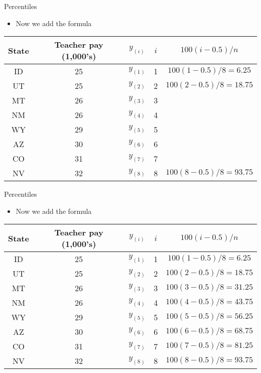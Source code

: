 \documentclass[xcolor=dvipsnames]{beamer}
\begin{document}
\begin{frame}{Percentiles}
\begin{itemize}
	\item Now we add the formula
\end{itemize}
\begin{center}
	\begin{tabular}{|c|c|c|c|c|}
		\hline 
		\textbf{State} & \textbf{Teacher pay (1,000's)} & $y_{(i)}$ & $i$ & $100(i - 0.5)/n$ \\ 
		\hline \hline 
		ID & 25 & $y_{(1)}$& 1 & $100(1 - 0.5)/8 = 6.25$ \\  \hline 
		UT &  25  & $y_{(2)}$& 2& $100(2 - 0.5)/8 = 18.75$\\ \hline 
		MT &  26  & $y_{(3)}$& 3& \\ \hline 
		NM &  26  & $y_{(4)}$& 4& \\ \hline 
		WY &  29  & $y_{(5)}$& 5& \\ \hline 
		AZ & 30  & $y_{(6)}$& 6& \\ \hline 
		CO &  31 & $y_{(7)}$& 7& \\ \hline
		NV & 32  & $y_{(8)}$& 8& $100(8 - 0.5)/8 = 93.75$\\ \hline 
	\end{tabular} 
\end{center}
\end{frame}

\begin{frame}{Percentiles}
	\begin{itemize}
		\item Now we add the formula
	\end{itemize}
	\begin{center}
		\begin{tabular}{|c|c|c|c|c|}
			\hline 
			\textbf{State} & \textbf{Teacher pay (1,000's)} & $y_{(i)}$ & $i$ & $100(i - 0.5)/n$ \\ 
			\hline \hline 
			ID & 25 & $y_{(1)}$& 1 & $100(1 - 0.5)/8 = 6.25$ \\  \hline 
			UT &  25  & $y_{(2)}$& 2& $100(2 - 0.5)/8 = 18.75$\\ \hline 
			MT &  26  & $y_{(3)}$& 3& $100(3 - 0.5)/8 = 31.25$\\ \hline 
			NM &  26  & $y_{(4)}$& 4& $100(4 - 0.5)/8 = 43.75$\\ \hline 
			WY &  29  & $y_{(5)}$& 5& $100(5 - 0.5)/8 = 56.25$\\ \hline 
			AZ & 30  & $y_{(6)}$& 6& $100(6 - 0.5)/8 = 68.75$\\ \hline 
			CO &  31 & $y_{(7)}$& 7& $100(7 - 0.5)/8 = 81.25$\\ \hline
			NV & 32  & $y_{(8)}$& 8& $100(8 - 0.5)/8 = 93.75$\\ \hline 
		\end{tabular} 
	\end{center}
\end{frame}
\end{document}
